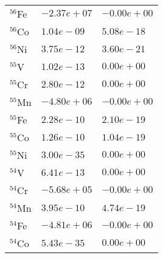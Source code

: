 \begin{tabular}{lll}
 $^{56}$Fe & $-2.37e+07 $                                                       & $-0.00e+00 $                                                          \\
 $^{56}$Co & $1.04e-09 $                                                        & $5.08e-18 $                                                           \\
 $^{56}$Ni & $3.75e-12 $                                                        & $3.60e-21 $                                                           \\
 $^{55}$V  & $1.02e-13 $                                                        & $0.00e+00 $                                                           \\
 $^{55}$Cr & $2.80e-12 $                                                        & $0.00e+00 $                                                           \\
 $^{55}$Mn & $-4.80e+06 $                                                       & $-0.00e+00 $                                                          \\
 $^{55}$Fe & $2.28e-10 $                                                        & $2.10e-19 $                                                           \\
 $^{55}$Co & $1.26e-10 $                                                        & $1.04e-19 $                                                           \\
 $^{55}$Ni & $3.00e-35 $                                                        & $0.00e+00 $                                                           \\
 $^{54}$V  & $6.41e-13 $                                                        & $0.00e+00 $                                                           \\
 $^{54}$Cr & $-5.68e+05 $                                                       & $-0.00e+00 $                                                          \\
 $^{54}$Mn & $3.95e-10 $                                                        & $4.74e-19 $                                                           \\
 $^{54}$Fe & $-4.81e+06 $                                                       & $-0.00e+00 $                                                          \\
 $^{54}$Co & $5.43e-35 $                                                        & $0.00e+00 $                                                           \\

\end{tabular}
